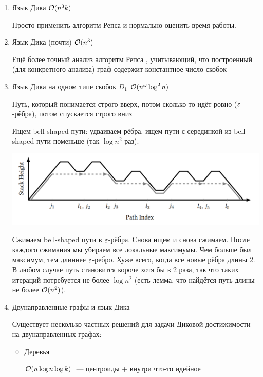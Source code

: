 \begin{enumerate}
    \item Язык Дика $\mathcal{O}(n^3 k)$ \cite{Kodumal04}

    Просто применить алгоритм Репса \cite{Reps97} и нормально оценить время работы.

    \item Язык Дика (почти) $\mathcal{O}(n^3)$ \cite{Rehof01}

    Ещё более точный анализ алгоритм Репса \cite{Reps97}, учитывающий, что построенный (для конкретного анализа) граф содержит константное число скобок

    \item Язык Дика на одном типе скобок $D_1$ $\mathcal{O}(n^{\omega} \log^2 n)$ \cite{Mathiasen21}

    \begin{definition}
        Путь, который понимается строго вверх, потом сколько-то идёт ровно ($\varepsilon$-рёбра), потом спускается строго вниз
    \end{definition}

    Ищем bell-shaped пути: удваиваем рёбра, ищем пути с серединкой из bell-shaped пути поменьше (так $\log n^2$ раз).

    \includegraphics[width=0.75\linewidth]{img/dyck1_path.png}

    Сжимаем bell-shaped пути в $\varepsilon$-рёбра. Снова ищем и снова сжимаем. После каждого сжимания мы убираем все локальные максимумы. Чем больше был максимум, тем длиннее $\varepsilon$-ребро. Хуже всего, когда все новые рёбра длины 2. В любом случае путь становится короче хотя бы в 2 раза, так что таких итераций потребуется не более $\log n^2$ (есть лемма, что найдётся путь длины не более $\mathcal{O}(n^2)$). 

    \item Двунаправленные графы и язык Дика

    Существует несколько частных решений для задачи Диковой достижимости на двунаправленных графах:

    \begin{itemize}
        \item Деревья \cite{Yuan09}

        $\mathcal{O}(n \log n \log k)$~--- центроиды + внутри что-то идейное


\end{itemize}
\end{enumerate}
